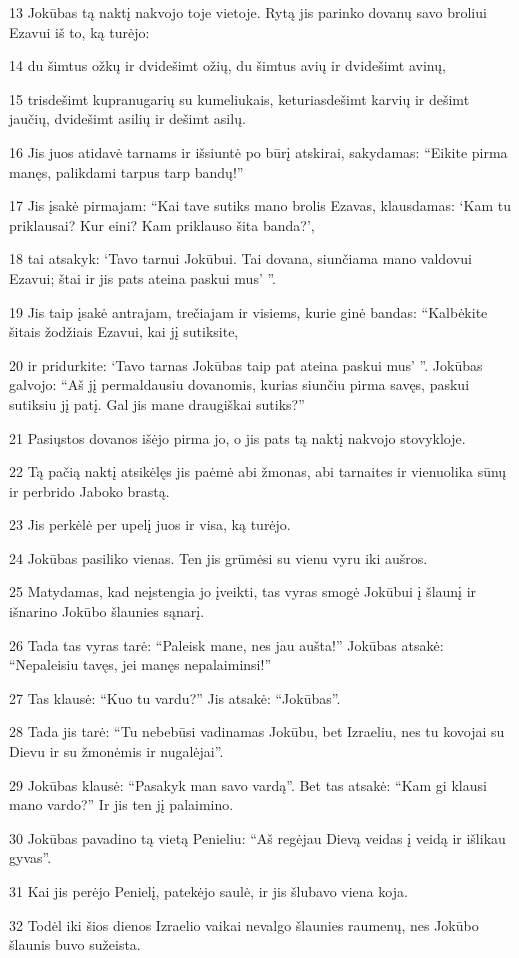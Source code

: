 \par 13 Jokūbas tą naktį nakvojo toje vietoje. Rytą jis parinko dovanų savo broliui Ezavui iš to, ką turėjo: 
\par 14 du šimtus ožkų ir dvidešimt ožių, du šimtus avių ir dvidešimt avinų, 
\par 15 trisdešimt kupranugarių su kumeliukais, keturiasdešimt karvių ir dešimt jaučių, dvidešimt asilių ir dešimt asilų. 
\par 16 Jis juos atidavė tarnams ir išsiuntė po būrį atskirai, sakydamas: “Eikite pirma manęs, palikdami tarpus tarp bandų!” 
\par 17 Jis įsakė pirmajam: “Kai tave sutiks mano brolis Ezavas, klausdamas: ‘Kam tu priklausai? Kur eini? Kam priklauso šita banda?’, 
\par 18 tai atsakyk: ‘Tavo tarnui Jokūbui. Tai dovana, siunčiama mano valdovui Ezavui; štai ir jis pats ateina paskui mus’ ”. 
\par 19 Jis taip įsakė antrajam, trečiajam ir visiems, kurie ginė bandas: “Kalbėkite šitais žodžiais Ezavui, kai jį sutiksite, 
\par 20 ir pridurkite: ‘Tavo tarnas Jokūbas taip pat ateina paskui mus’ ”. Jokūbas galvojo: “Aš jį permaldausiu dovanomis, kurias siunčiu pirma savęs, paskui sutiksiu jį patį. Gal jis mane draugiškai sutiks?” 
\par 21 Pasiųstos dovanos išėjo pirma jo, o jis pats tą naktį nakvojo stovykloje. 
\par 22 Tą pačią naktį atsikėlęs jis paėmė abi žmonas, abi tarnaites ir vienuolika sūnų ir perbrido Jaboko brastą. 
\par 23 Jis perkėlė per upelį juos ir visa, ką turėjo. 
\par 24 Jokūbas pasiliko vienas. Ten jis grūmėsi su vienu vyru iki aušros. 
\par 25 Matydamas, kad neįstengia jo įveikti, tas vyras smogė Jokūbui į šlaunį ir išnarino Jokūbo šlaunies sąnarį. 
\par 26 Tada tas vyras tarė: “Paleisk mane, nes jau aušta!” Jokūbas atsakė: “Nepaleisiu tavęs, jei manęs nepalaiminsi!” 
\par 27 Tas klausė: “Kuo tu vardu?” Jis atsakė: “Jokūbas”. 
\par 28 Tada jis tarė: “Tu nebebūsi vadinamas Jokūbu, bet Izraeliu, nes tu kovojai su Dievu ir su žmonėmis ir nugalėjai”. 
\par 29 Jokūbas klausė: “Pasakyk man savo vardą”. Bet tas atsakė: “Kam gi klausi mano vardo?” Ir jis ten jį palaimino. 
\par 30 Jokūbas pavadino tą vietą Penieliu: “Aš regėjau Dievą veidas į veidą ir išlikau gyvas”. 
\par 31 Kai jis perėjo Penielį, patekėjo saulė, ir jis šlubavo viena koja. 
\par 32 Todėl iki šios dienos Izraelio vaikai nevalgo šlaunies raumenų, nes Jokūbo šlaunis buvo sužeista.



